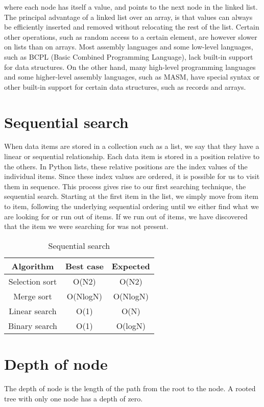 \documentclass{article}
\begin{document}
\begin{}
where each node has itself a value, and points to the
next node in the linked list. The principal advantage
of a linked list over an array, is that values can always
be efficiently inserted and removed without relocating
the rest of the list. Certain other operations, such as
random access to a certain element, are however
slower on lists than on arrays. Most assembly languages and some low-level languages, such as
BCPL (Basic Combined Programming Language),
lack built-in support for data structures. On the other
hand, many high-level programming languages and
some higher-level assembly languages, such as
MASM, have special syntax or other built-in support
for certain data structures, such as records and arrays.

\section{Sequential search}

When data items are stored in a collection such as a
list, we say that they have a linear or sequential
relationship. Each data item is stored in a position
relative to the others. In Python lists, these relative
positions are the index values of the individual items.
Since these index values are ordered, it is possible for
us to visit them in sequence. This process gives rise to
our first searching technique, the sequential search.
Starting at the first item in the list, we simply move
from item to item, following the underlying sequential
ordering until we either find what we are looking for
or run out of items. If we run out of items, we have
discovered that the item we were searching for was
not present.
\begin{table}[ht]
    \centering
    \begin{tabular}{|c|c|c|}
    \hline
        Algorithm & Best  case  & Expected\\
       \hline
       Selection sort & O(N2) & O(N2)\\
       \hline
           Merge sort &O(NlogN) &O(NlogN)\\
       \hline
         Linear search& O(1) & O(N)\\
         \hline
         Binary search& O(1) & O(logN)\\
         \hline
    \end{tabular}
    \caption{Sequential search}
    \label{tab:my_label}
\end{table}
\section{Depth of node}
The depth of node is the length of the path from the
root to the node. A rooted tree with only one node has
a depth of zero.



\end{}
\end{document}
